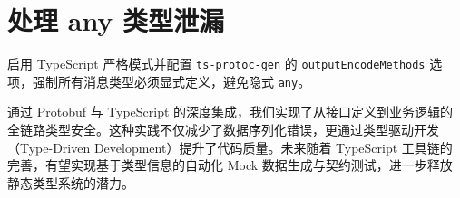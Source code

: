 \section{处理 any 类型泄漏}
启用 TypeScript 严格模式并配置 \verb!ts-protoc-gen! 的 \verb!outputEncodeMethods! 选项，强制所有消息类型必须显式定义，避免隐式 \verb!any!。\par
通过 Protobuf 与 TypeScript 的深度集成，我们实现了从接口定义到业务逻辑的全链路类型安全。这种实践不仅减少了数据序列化错误，更通过类型驱动开发（Type-Driven Development）提升了代码质量。未来随着 TypeScript 工具链的完善，有望实现基于类型信息的自动化 Mock 数据生成与契约测试，进一步释放静态类型系统的潜力。\par
